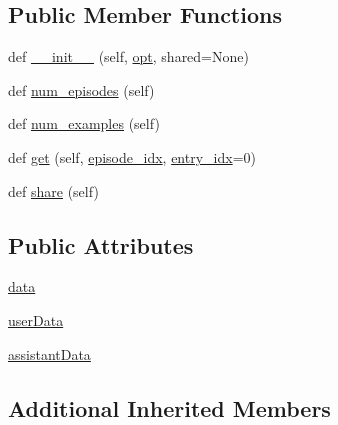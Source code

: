 \subsection*{Public Member Functions}
\begin{DoxyCompactItemize}
\item 
def \hyperlink{classparlai_1_1tasks_1_1ccpe_1_1agents_1_1CCPEAllTeacher_a7740c7de97e893e02c37bd64eccc3876}{\+\_\+\+\_\+init\+\_\+\+\_\+} (self, \hyperlink{classparlai_1_1core_1_1agents_1_1Teacher_a3ce6243860ce978a897922863ed32fa4}{opt}, shared=None)
\item 
def \hyperlink{classparlai_1_1tasks_1_1ccpe_1_1agents_1_1CCPEAllTeacher_a0f9ed996020d75cb7e204f72465f46d6}{num\+\_\+episodes} (self)
\item 
def \hyperlink{classparlai_1_1tasks_1_1ccpe_1_1agents_1_1CCPEAllTeacher_aa0cd16c6ebf2fa6bc0c8ad2e449445de}{num\+\_\+examples} (self)
\item 
def \hyperlink{classparlai_1_1tasks_1_1ccpe_1_1agents_1_1CCPEAllTeacher_aca16523f7aa61db6fc1c3fa561334521}{get} (self, \hyperlink{classparlai_1_1core_1_1teachers_1_1FixedDialogTeacher_afd4ebab8063eb42d182d30a1a41f133e}{episode\+\_\+idx}, \hyperlink{classparlai_1_1core_1_1teachers_1_1FixedDialogTeacher_ae3201b15f3c3b46a2f3511bad9b43e7d}{entry\+\_\+idx}=0)
\item 
def \hyperlink{classparlai_1_1tasks_1_1ccpe_1_1agents_1_1CCPEAllTeacher_ab1b9d65d88c950391175472d72694f80}{share} (self)
\end{DoxyCompactItemize}
\subsection*{Public Attributes}
\begin{DoxyCompactItemize}
\item 
\hyperlink{classparlai_1_1tasks_1_1ccpe_1_1agents_1_1CCPEAllTeacher_a47ccafd4c6309239c2bf3adede15324b}{data}
\item 
\hyperlink{classparlai_1_1tasks_1_1ccpe_1_1agents_1_1CCPEAllTeacher_ac05613e2339436bf69b6319a197a6ce5}{user\+Data}
\item 
\hyperlink{classparlai_1_1tasks_1_1ccpe_1_1agents_1_1CCPEAllTeacher_a87116ac748a76cceda5a74869e330a1e}{assistant\+Data}
\end{DoxyCompactItemize}
\subsection*{Additional Inherited Members}


